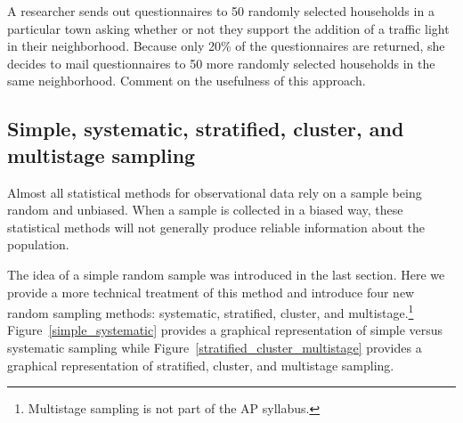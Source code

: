 \D{\newpage}

\begin{exercisewrap}
\begin{nexercise}
A researcher sends out questionnaires to 50 randomly selected households in a particular town asking whether or not they support the addition of a traffic light in their neighborhood. Because only 20\% of the questionnaires are returned, she decides to mail questionnaires to 50 more randomly selected households in the same neighborhood. Comment on the usefulness of this approach.\footnotemark
\end{nexercise}
\end{exercisewrap}





\subsection[Simple, systematic, stratified, cluster, and multistage sampling]{Simple, systematic, stratified, cluster, and multistage sampling}
\label{threeSamplingMethods}

Almost all statistical methods for observational data rely on a sample being random and unbiased. When a sample is collected in a biased way, these statistical methods will not generally produce reliable information about the population.

The idea of a simple random sample was introduced in the last section. Here we provide a more technical treatment of this method and introduce four new random sampling methods: systematic, stratified, cluster, and multistage.\footnote{Multistage sampling is not part of the AP syllabus.} Figure~\ref{simple_systematic} provides a graphical representation of simple versus systematic sampling while Figure~\ref{stratified_cluster_multistage} provides a graphical representation of stratified, cluster, and multistage sampling.

